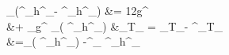 \documentclass[10pt,letterpaper]{article}
\begin{document}
\ba
	 \del_\mu (\Gamma^\sigma_{\rho\nu}h^\rho{}_\sigma - \Gamma^\sigma_{\sigma\rho}h^\rho{}_\nu) &=  \frac12g^{\lambda\rho}  \\
	&\quad + \pd_\mu g^{\lambda\rho} 
\ea
\vspace{500mm}
\ba
	\del_\mu( \Gamma^\sigma_{\rho\nu}h^\rho{}_\sigma ) &\equiv \del_\mu T_{\nu} = \pd_\mu T_\nu - \Gamma^\lambda_{\mu\nu}T_\lambda\\
	&=\pd_\mu( \Gamma^\sigma_{\rho\nu}h^\rho{}_\sigma) -\Gamma^\lambda_{\mu\nu} \Gamma^\sigma_{\rho\lambda}h^\rho{}_\sigma
\ea
\end{document}
